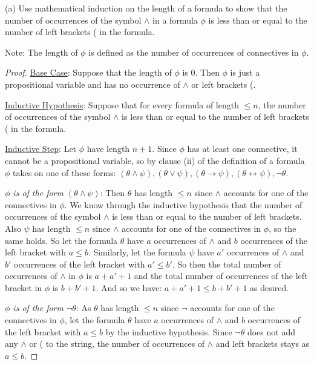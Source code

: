 \documentclass{article}
\begin{document}
(a) Use mathematical induction  on the length of a formula to show that the number of occurrences of the symbol $\land$ in a formula $\phi$ is less than or equal to the number of left brackets ( in the formula.

Note: The length of $\phi$ is defined as the number of occurrences of connectives in $\phi$.

\begin{proof}
    
    \underline{Base Case}: Suppose that the length of $\phi$ is 0. Then $\phi$ is just a propositional variable and has no occurrence of $\land$ or left brackets (.


    \underline{Inductive Hypothesis}: Suppose that for every formula of length $\leq n$, the number of occurrences of the symbol $\land$ is less than or equal to the number of left brackets ( in the formula.

    \underline{Inductive Step}: Let $\phi$ have length $n + 1$. Since $\phi$ has at least one connective, it cannot be a propositional variable, so by clause (ii) of the definition of a formula $\phi$ takes on one of these forms: $(\theta \land \psi), (\theta \lor \psi), (\theta \rightarrow \psi), (\theta \leftrightarrow \psi), \neg \theta$. 
    
    \textit{$\phi$ is of the form $(\theta \land \psi)$}: Then $\theta$ has length $\leq n$ since $\land$ accounts for one of the connectives in $\phi$. We know through the inductive hypothesis that the number of occurrences of the symbol $\land$ is less than or equal to the number of left brackets. Also $\psi$ has length $\leq n$ since $\land$ accounts for one of the connectives in $\phi$, so the same holds. So let the formula $\theta$ have $a$ occurrences of $\land$ and $b$ occurrences of the left bracket with $a \leq b$. Similarly, let the formula $\psi$ have $a'$ occurrences of $\land$ and $b'$ occurrences of the left bracket with $a' \leq b'$. So then the total number of occurrences of $\land$ in $\phi$ is $a + a' + 1$ and the total number of occurrences of the left bracket in $\phi$ is $b + b' + 1$. And so we have: $a + a' + 1 \leq b + b' + 1$ as desired.

    \textit{$\phi$ is of the form $\neg \theta$}: As $\theta$ has length $\leq n$ since $\neg$ accounts for one of the connectives in $\phi$, let the formula $\theta$ have $a$ occurrences of $\land$ and $b$ occurrences of the left bracket with $a \leq b$ by the inductive hypothesis. Since $\neg \theta$ does not add any $\land$ or ( to the string, the number of occurrences of $\land$ and left brackets stays as $a \leq b$.


\end{proof}
\end{document}
